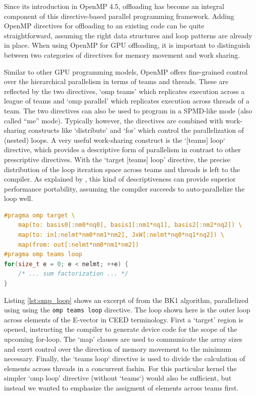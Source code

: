\documentclass[a4paper,12pt]{article}
\begin{document}
Since its introduction in OpenMP 4.5, offloading has become an integral component
of this directive-based parallel programming framework.
Adding OpenMP directives for offloading to an existing code can be quite straightforward,
assuming the right data structures and loop patterns are already in place.
When using OpenMP for GPU offloading, it is important to distinguish between two
categories of directives for memory movement and work sharing.

Similar to other GPU programming models, OpenMP offers fine-grained control over the hierarchical parallelism in terms of teams and threads. These are reflected by the two directives, `omp teams' which replicates execution across a league of teams and `omp parallel' which replicates execution across threads of a team. 
The two directives can also be used to program in a SPMD-like mode (also called ``me'' mode). 
Typically however, the directives are combined with work-sharing
constructs like `distribute' and `for' which control the parallelization of (nested) loops.
A very useful work-sharing construct is the `[teams] loop` directive, which provides 
a descriptive form of parallelism in contrast to other prescriptive directives.
With the `target [teams] loop' directive, the precise distribution of the loop iteration space across teams and threads is left to the compiler. 
As explained by \cite{Deakin23}, this kind of descriptiveness can provide
superior performance portability, assuming the compiler succeeds to auto-parallelize
the loop well.

\begin{lstlisting}[language=C++,caption={The `omp teams loop' directive},
                   label={lst:omp_loop}]
#pragma omp target \
    map(to: basis0[:nm0*nq0], basis1[:nm1*nq1], basis2[:nm2*nq2]) \
    map(to: in[:nelmt*nm0*nm1*nm2], JxW[:nelmt*nq0*nq1*nq2]) \
    map(from: out[:nelmt*nm0*nm1*nm2])
#pragma omp teams loop
for(size_t e = 0; e < nelmt; ++e) {
    /* ... sum factorization ... */
}
\end{lstlisting}

Listing \ref{lst:omp_loop} shows an excerpt of from the BK1 algorithm, parallelized using using the \texttt{omp teams loop} directive. 
The loop shown here is the outer loop across elements of the E-vector in CEED terminology.
First a `target' region is opened, instructing the compiler to generate
device code for the scope of the upcoming for-loop. 
The `map' clauses are used to communicate the array sizes and exert control over the direction of memory movement to the minimum necessary.
Finally, the `teams loop` directive is used to divide the calculation of elements across threads in a concurrent fashin.
For this particular kernel the simpler `omp loop' directive (without `teams`) would also be sufficient, but instead we wanted to emphasize the assigment of elements across teams first.
\end{document}
